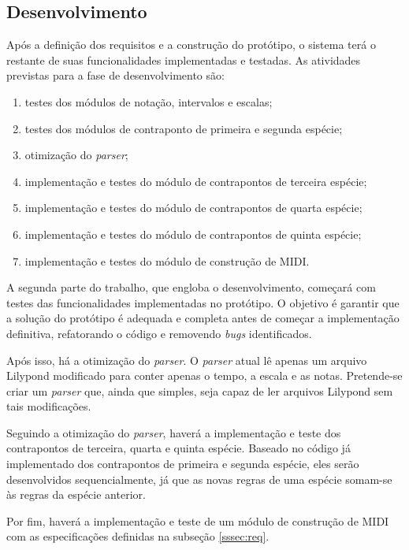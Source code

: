   \subsection[Desenvolvimento]{Desenvolvimento}

    Após a definição dos requisitos e a construção do protótipo, o sistema terá o restante de suas funcionalidades implementadas e testadas. As atividades previstas para a fase de desenvolvimento são:

    \begin{enumerate}
      \item testes dos módulos de notação, intervalos e escalas;
      \item testes dos módulos de contraponto de primeira e segunda espécie;
      \item otimização do \textit{parser};
      \item implementação e testes do módulo de contrapontos de terceira espécie;
      \item implementação e testes do módulo de contrapontos de quarta espécie;
      \item implementação e testes do módulo de contrapontos de quinta espécie;
      \item implementação e testes do módulo de construção de MIDI.
    \end{enumerate}

    A segunda parte do trabalho, que engloba o desenvolvimento, começará com testes das funcionalidades implementadas no protótipo. O objetivo é garantir que a solução do protótipo é adequada e completa antes de começar a implementação definitiva, refatorando o código e removendo \textit{bugs} identificados.

    Após isso, há a otimização do \textit{parser}. O \textit{parser} atual lê apenas um arquivo Lilypond modificado para conter apenas o tempo, a escala e as notas. Pretende-se criar um \textit{parser} que, ainda que simples, seja capaz de ler arquivos Lilypond sem tais modificações.

    Seguindo a otimização do \textit{parser}, haverá a implementação e teste dos contrapontos de terceira, quarta e quinta espécie. Baseado no código já implementado dos contrapontos de primeira e segunda espécie, eles serão desenvolvidos sequencialmente, já que as novas regras de uma espécie somam-se às regras da espécie anterior.

    Por fim, haverá a implementação e teste de um módulo de construção de MIDI com as especificações definidas na subseção \ref{sssec:req}.
